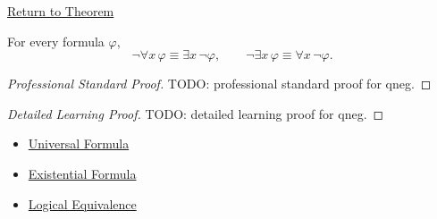 \newpage
{}
\label{prf:qneg}

\begin{remark*}[Return]
\hyperref[thm:qneg]{Return to Theorem}
\end{remark*}

\begin{theorem*}
For every formula \(\varphi\),
\[
\neg\forall x\,\varphi \equiv \exists x\,\neg\varphi,
\qquad
\neg\exists x\,\varphi \equiv \forall x\,\neg\varphi.
\]
\end{theorem*}

\begin{proof}[Professional Standard Proof]
\LRAProofBodyStart
TODO: professional standard proof for qneg.
\end{proof}

\begin{proof}[Detailed Learning Proof]
\LRAProofBodyStart
TODO: detailed learning proof for qneg.
\end{proof}

\begin{remark*}
\end{remark*}

\begin{dependencies}
\begin{itemize}
  \item \hyperref[def:universal-q]{Universal Formula}
  \item \hyperref[def:existential-q]{Existential Formula}
  \item \hyperref[def:log-equiv]{Logical Equivalence}
\end{itemize}
\end{dependencies}

\clearpage
